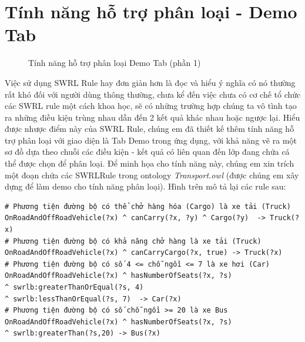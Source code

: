 \section{Tính năng hỗ trợ phân loại - Demo Tab}
\begin{figure}[ht!]
	\centering
	\caption{Tính năng hỗ trợ phân loại Demo Tab (phần 1)\label{overflow}}
\end{figure}
Việc sử dụng SWRL Rule hay đơn giản hơn là đọc và hiểu ý nghĩa có nó thường rất khó đối với người dùng thông thường, chưa kể đến việc chưa có cơ chế tổ chức các SWRL rule một cách khoa học, sẽ có những trường hợp chúng ta vô tình tạo ra những điều kiện trùng nhau dẫn đến 2 kết quả khác nhau hoặc ngược lại. Hiểu được nhược điểm này của SWRL Rule, chúng em đã thiết kế thêm tính năng hỗ trợ phân loại với giao diện là Tab Demo trong ứng dụng, với khả năng vẽ ra một sơ đồ dựa theo chuỗi các điều kiện - kết quả có liên quan đến lớp đang chứa cá thể được chọn để phân loại. Để minh họa cho tính năng này, chúng em xin trích một đoạn chứa các SWRLRule trong ontology \textit{Transport.owl} \cite{owleditorSrc} (được chúng em xây dựng để làm demo cho tính năng phân loại). Hình trên mô tả lại các rule sau:
\begin{verbatim}
# Phương tiện đường bộ có thể chở hàng hóa (Cargo) là xe tải (Truck)
OnRoadAndOffRoadVehicle(?x) ^ canCarry(?x, ?y) ^ Cargo(?y)  -> Truck(?x)
# Phương tiện đường bộ có khả năng chở hàng là xe tải (Truck)
OnRoadAndOffRoadVehicle(?x) ^ canCarryCargo(?x, true) -> Truck(?x)
# Phương tiện đường bộ có số 4 <= chỗ ngồi <= 7 là xe hơi (Car)
OnRoadAndOffRoadVehicle(?x) ^ hasNumberOfSeats(?x, ?s)
^ swrlb:greaterThanOrEqual(?s, 4) 
^ swrlb:lessThanOrEqual(?s, 7)  -> Car(?x)
# Phương tiện đường bộ có số chỗ ngồi >= 20 là xe Bus 
OnRoadAndOffRoadVehicle(?x) ^ hasNumberOfSeats(?x, ?s) 
^ swrlb:greaterThan(?s,20) -> Bus(?x)                               
\end{verbatim}
